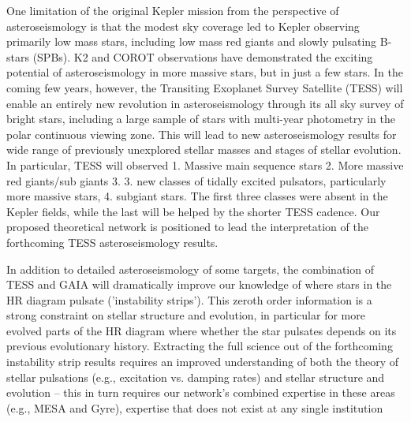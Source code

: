 One limitation of the original Kepler mission from the perspective of asteroseismology is that the modest sky coverage led to Kepler observing primarily low mass stars, including low mass red giants and slowly pulsating B-stars (SPBs).  K2 and COROT observations have demonstrated the exciting potential of asteroseismology in more massive stars, but in just a few stars.   In the coming few years, however, the Transiting Exoplanet Survey Satellite (TESS) will enable an entirely new revolution in asteroseismology through its all sky survey of bright stars, including a large sample of stars with multi-year photometry in the polar continuous viewing zone.   This will lead to new asteroseismology results for wide range of previously unexplored stellar masses and stages of stellar evolution.   In particular, TESS will observed 1.  Massive main sequence stars 2. More massive red giants/sub giants 3. 3.  new classes of tidally excited pulsators, particularly more massive stars, 4. subgiant stars.   The first three classes were absent in the Kepler fields, while the last will be helped by the shorter TESS cadence.   Our proposed theoretical network is positioned to lead the interpretation of the forthcoming TESS asteroseismology results.  

In addition to detailed asteroseismology of some targets, the combination of TESS and GAIA will dramatically improve our knowledge of where stars in the HR diagram pulsate ('instability strips').   This zeroth order information is  a strong constraint on stellar structure and evolution, in particular for more evolved parts of the HR diagram where whether the star pulsates depends on its previous evolutionary history.  Extracting the full science out of the forthcoming instability strip results requires an improved understanding of both the theory of stellar pulsations (e.g., excitation vs. damping rates) and stellar structure and evolution -- this in turn requires our network's combined expertise in these areas (e.g., MESA and Gyre), expertise that does not exist at any single institution

